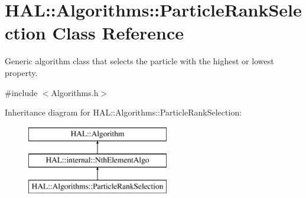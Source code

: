 \hypertarget{class_h_a_l_1_1_algorithms_1_1_particle_rank_selection}{\section{H\-A\-L\-:\-:Algorithms\-:\-:Particle\-Rank\-Selection Class Reference}
\label{class_h_a_l_1_1_algorithms_1_1_particle_rank_selection}
}


Generic algorithm class that selects the particle with the highest or lowest property.  




{\ttfamily \#include $<$Algorithms.\-h$>$}

Inheritance diagram for H\-A\-L\-:\-:Algorithms\-:\-:Particle\-Rank\-Selection\-:\begin{figure}[H]
\begin{center}
\leavevmode
\includegraphics[height=3.000000cm]{class_h_a_l_1_1_algorithms_1_1_particle_rank_selection}
\end{center}
\end{figure}
